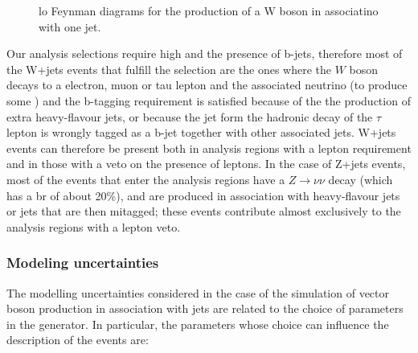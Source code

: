 \begin{figure}[h]
\centering 
{}
\caption{\gls{lo} Feynman diagrams for the production of a W boson in associatino with one jet.}\label{fig:W_prod}
\end{figure}

Our analysis selections require high \met and the presence of b-jets, therefore most of the W+jets events that fulfill the selection are the ones where the $W$ boson decays to a electron, muon or tau lepton 
and the associated neutrino (to produce some \met) and the b-tagging requirement is satisfied because of the the production of extra heavy-flavour jets, or because the jet form the hadronic decay of the $\tau$
lepton is wrongly tagged as a b-jet together with other associated jets. 
W+jets events can therefore be present both in analysis regions with a lepton requirement and in those with a veto on the presence of leptons. 
In the case of Z+jets events, most of the events that enter the analysis regions have a $Z \to \nu \nu$ decay (which has a \gls{br} of about 20\%), and are produced in association with 
heavy-flavour jets or jets that are then mitagged; these events contribute almost exclusively to the analysis regions with a lepton veto. 

\subsubsection*{Modeling uncertainties}

The modelling uncertainties considered in the case of the simulation of vector boson production in association with jets are related to the choice of parameters in the \Sherpa generator. 
In particular, the parameters whose choice can influence the description of the events are:

